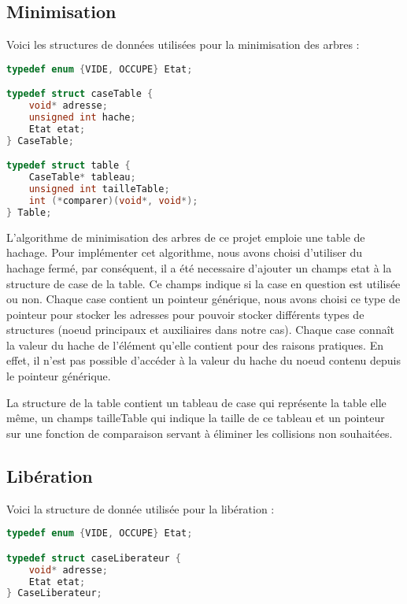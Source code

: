 \documentclass[15pt, a4paper]{article}
\begin{document}
\subsection{Minimisation}

\noindent Voici les structures de données utilisées pour la minimisation des arbres :

\begin{lstlisting}[language=c]
typedef enum {VIDE, OCCUPE} Etat;

typedef struct caseTable {
    void* adresse;
    unsigned int hache;
    Etat etat;
} CaseTable;

typedef struct table {
    CaseTable* tableau;
    unsigned int tailleTable;
    int (*comparer)(void*, void*);
} Table;
\end{lstlisting}

L'algorithme de minimisation des arbres de ce projet emploie une table
de hachage. Pour implémenter cet algorithme, nous avons choisi
d'utiliser du hachage fermé, par conséquent, il a été necessaire
d'ajouter un champs etat à la structure de case de la table. Ce champs
indique si la case en question est utilisée ou non. Chaque case contient
un pointeur générique, nous avons choisi ce type de pointeur pour
stocker les adresses pour pouvoir stocker différents types de structures
(noeud principaux et auxiliaires dans notre cas). Chaque case connaît
la valeur du hache de l'élément qu'elle contient pour des raisons
pratiques. En effet, il n'est pas possible d'accéder à la valeur du
hache du noeud contenu depuis le pointeur générique.

\bigskip

La structure de la table contient un tableau de case qui représente la
table elle même, un champs tailleTable qui indique la taille de ce 
tableau et un pointeur sur une fonction de comparaison servant à
éliminer les collisions non souhaitées.

\subsection{Libération}

\noindent Voici la structure de donnée utilisée pour la libération :

\begin{lstlisting}[language=c]
typedef enum {VIDE, OCCUPE} Etat;

typedef struct caseLiberateur {
    void* adresse;
    Etat etat;
} CaseLiberateur;
\end{lstlisting}
\end{document}
